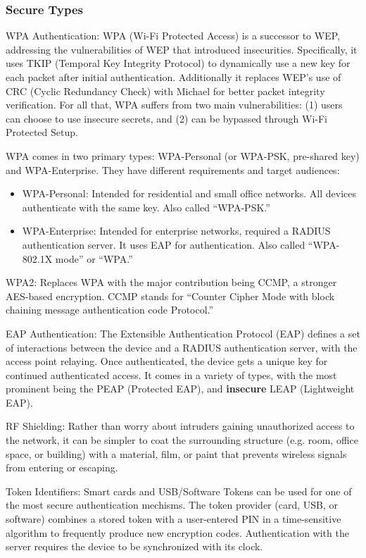 \subsubsection{Secure Types}
\begin{description}
\item{WPA Authentication:} WPA (Wi-Fi Protected Access) is a successor to WEP, addressing the
vulnerabilities of WEP that introduced insecurities. Specifically, it uses TKIP (Temporal Key
Integrity Protocol) to dynamically use a new key for each packet after initial authentication.
Additionally it replaces WEP's use of CRC (Cyclic Redundancy Check) with Michael for better packet
integrity verification. For all that, WPA suffers from two main vulnerabilities: (1) users can
choose to use insecure secrets, and (2) can be bypassed through Wi-Fi Protected Setup.

WPA comes in two primary types: WPA-Personal (or WPA-PSK, pre-shared key) and WPA-Enterprise. They
have different requirements and target audiences: \cite{wiki:WPA}
\begin{itemize}
\item{WPA-Personal:} Intended for residential and small office networks. All devices authenticate
with the same key. Also called ``WPA-PSK.''
\item{WPA-Enterprise:} Intended for enterprise networks, required a RADIUS authentication server.
It uses EAP for authentication. Also called ``WPA-802.1X mode'' or ``WPA.''
\end{itemize}

\item{WPA2:} Replaces WPA with the major contribution being CCMP, a stronger AES-based encryption.
CCMP stands for ``Counter Cipher Mode with block chaining message authentication code Protocol.''

\item{EAP Authentication:} The Extensible Authentication Protocol (EAP) defines a set of
interactions between the device and a RADIUS authentication server, with the access point
relaying. Once authenticated, the device gets a unique key for continued authenticated access. It
comes in a variety of types, with the most prominent being the PEAP (Protected EAP), and
\textbf{insecure} LEAP (Lightweight EAP).

\item{RF Shielding:} Rather than worry about intruders gaining unauthorized access to the network,
it can be simpler to coat the surrounding structure (e.g. room, office space, or building) with
a material, film, or paint that prevents wireless signals from entering or escaping.

\item{Token Identifiers:} Smart cards and USB/Software Tokens can be used for one of the most
secure authentication mechisms. The token provider (card, USB, or software) combines a stored
token with a user-entered PIN in a time-sensitive algorithm to frequently produce new encryption
codes. Authentication with the server requires the device to be synchronized with its clock.
\end{description}

